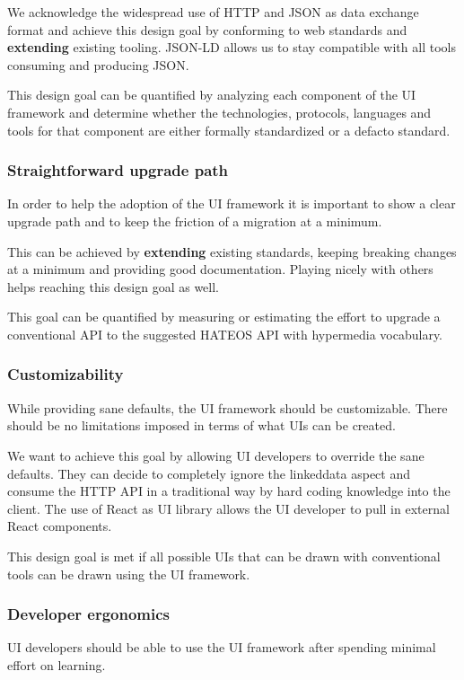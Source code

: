 We acknowledge the widespread use of HTTP and JSON as data exchange format and achieve this design goal by conforming to web standards and \textbf{extending} existing tooling. JSON-LD allows us to stay compatible with all tools consuming and producing JSON.

This design goal can be quantified by analyzing each component of the UI framework and determine whether the technologies, protocols, languages and tools for that component are either formally standardized or a defacto standard.

\subsubsection{Straightforward upgrade path}
In order to help the adoption of the UI framework it is important to show a clear upgrade path and to keep the friction of a migration at a minimum.

This can be achieved by \textbf{extending} existing standards, keeping breaking changes at a minimum and providing good documentation. Playing nicely with others helps reaching this design goal as well.

This goal can be quantified by measuring or estimating the effort to upgrade a conventional API to the suggested HATEOS API with hypermedia vocabulary.

\subsubsection{Customizability}
While providing sane defaults, the UI framework should be customizable. There should be no limitations imposed in terms of what UIs can be created.

We want to achieve this goal by allowing UI developers to override the sane defaults. They can decide to completely ignore the \gls{linkeddata} aspect and consume the HTTP API in a traditional way by hard coding knowledge into the client. The use of React as UI library allows the UI developer to pull in external React components.

This design goal is met if all possible UIs that can be drawn with conventional tools can be drawn using the UI framework.

\subsubsection{Developer ergonomics}
UI developers should be able to use the UI framework after spending minimal effort on learning.

